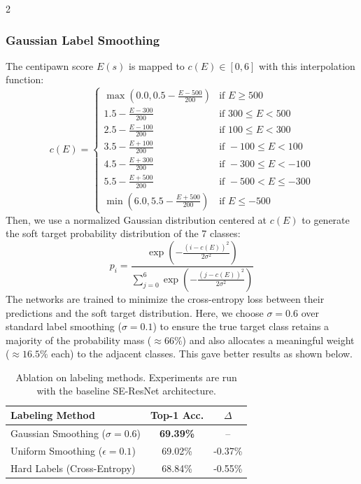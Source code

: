 \documentclass[a4paper,10pt]{article}
\begin{document}
\begin{multicols*}{2}
\subsubsection{Gaussian Label Smoothing}
\label{label_smoothing}
The centipawn score $E(s)$ is mapped to $c(E) \in [0, 6]$ with this interpolation function:
\[
c(E) =
\begin{cases}
\max\left(0.0, 0.5 - \frac{E - 500}{200}\right) & \text{if } E \ge 500 \\
1.5 - \frac{E - 300}{200} & \text{if } 300 \le E < 500 \\
2.5 - \frac{E - 100}{200} & \text{if } 100 \le E < 300 \\
3.5 - \frac{E + 100}{200} & \text{if } -100 \le E < 100 \\
4.5 - \frac{E + 300}{200} & \text{if } -300 \le E < -100 \\
5.5 - \frac{E + 500}{200} & \text{if } -500 < E \le -300 \\
\min\left(6.0, 5.5 - \frac{E + 500}{200}\right) & \text{if } E \le -500
\end{cases}\]
Then, we use a normalized Gaussian distribution centered at $c(E)$ to generate the soft target probability distribution of the 7 classes:
\[p_i = \frac{\exp\left( - \frac{(i - c(E))^2}{2\sigma^2} \right)}{\sum_{j=0}^{6} \exp\left( - \frac{(j - c(E))^2}{2\sigma^2} \right)}\]
The networks are trained to minimize the cross-entropy loss between their predictions and the soft target distribution. Here, we choose $\sigma = 0.6$ over standard label smoothing ($\sigma = 0.1$) to ensure the true target class retains a majority of the probability mass ($\approx66\%$) and also allocates a meaningful weight ($\approx16.5\%$ each) to the adjacent classes. This gave better results as shown below. 
\begin{table}[H]
\centering
\caption{Ablation on labeling methods. Experiments are run with the baseline SE-ResNet architecture.}
\label{tab:label_ablation}
\begin{tabular}{@{}lcc@{}}
\toprule
\textbf{Labeling Method} & \textbf{Top-1 Acc.} & \textbf{$\Delta$} \\ \midrule
Gaussian Smoothing ($\sigma=0.6$) & \textbf{69.39\%} & -- \\
Uniform Smoothing ($\epsilon=0.1$) & 69.02\% & -0.37\% \\
Hard Labels (Cross-Entropy) & 68.84\% & -0.55\% \\ \bottomrule
\end{tabular}
\end{table}


\end{multicols*}
\end{document}

